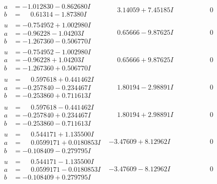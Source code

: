 \documentclass[1p]{elsarticle_modified}
\theoremstyle{definition}
\begin{document}
$$\begin{array}{c|c|c}
\begin{aligned}
a &= -1.012830 - 0.862680 I \\
b &= \phantom{-}0.61314 - 1.87380 I\end{aligned}
 & \phantom{-}3.14059 + 7.45185 I & \phantom{-0.000000 } 0 \\ \hline\begin{aligned}
u &= -0.754952 + 1.002980 I \\
a &= -0.96228 - 1.04203 I \\
b &= -1.267360 - 0.506770 I\end{aligned}
 & \phantom{-}0.65666 - 9.87625 I & \phantom{-0.000000 } 0 \\ \hline\begin{aligned}
u &= -0.754952 - 1.002980 I \\
a &= -0.96228 + 1.04203 I \\
b &= -1.267360 + 0.506770 I\end{aligned}
 & \phantom{-}0.65666 + 9.87625 I & \phantom{-0.000000 } 0 \\ \hline\begin{aligned}
u &= \phantom{-}0.597618 + 0.441462 I \\
a &= -0.257840 - 0.234467 I \\
b &= -0.253860 + 0.711613 I\end{aligned}
 & \phantom{-}1.80194 - 2.98891 I & \phantom{-0.000000 } 0 \\ \hline\begin{aligned}
u &= \phantom{-}0.597618 - 0.441462 I \\
a &= -0.257840 + 0.234467 I \\
b &= -0.253860 - 0.711613 I\end{aligned}
 & \phantom{-}1.80194 + 2.98891 I & \phantom{-0.000000 } 0 \\ \hline\begin{aligned}
u &= \phantom{-}0.544171 + 1.135500 I \\
a &= \phantom{-}0.0599171 + 0.0180853 I \\
b &= -0.108409 - 0.279795 I\end{aligned}
 & -3.47609 + 8.12962 I & \phantom{-0.000000 } 0 \\ \hline\begin{aligned}
u &= \phantom{-}0.544171 - 1.135500 I \\
a &= \phantom{-}0.0599171 - 0.0180853 I \\
b &= -0.108409 + 0.279795 I\end{aligned}
 & -3.47609 - 8.12962 I & \phantom{-0.000000 } 0 \\ \hline\begin{aligned}

\end{aligned}
\end{array}$$
\end{document}
